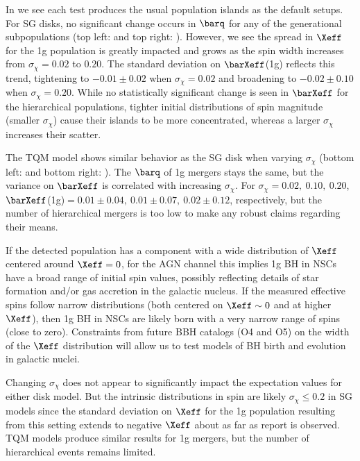 In  we see each test produces the usual population islands as the default setups.
For SG disks, no significant change occurs in $\barq$ for any of the generational subpopulations (top left:  and top right: ).
However, we see the spread in $\Xeff$ for the 1g population is greatly impacted and grows as the spin width increases from $\sigma_\chi= 0.02$ to $0.20$.
The standard deviation on $\barXeff$(1g) reflects this trend, tightening to $-0.01\pm0.02$ when $\sigma_\chi = 0.02$ and broadening to $-0.02\pm0.10$ when $\sigma_\chi = 0.20$.
While no statistically significant change is seen in $\barXeff$ for the hierarchical populations, tighter initial distributions of spin magnitude (smaller $\sigma_\chi$) cause their islands to be more concentrated, whereas a larger $\sigma_\chi$ increases their scatter.

The TQM model shows similar behavior as the SG disk when varying $\sigma_\chi$ (bottom left:  and bottom right: ).
The $\barq$ of 1g mergers stays the same, but the variance on $\barXeff$ is correlated with increasing $\sigma_\chi$.
For $\sigma_\chi=0.02,\ 0.10,\ 0.20$, $\barXeff$(1g)$=0.01\pm0.04,\ 0.01\pm0.07,\ 0.02\pm0.12$, respectively, but the number of hierarchical mergers is too low to make any robust claims regarding their means.

If the detected population has a component with a wide distribution of $\Xeff$ centered around $\Xeff=0$, for the AGN channel this implies 1g BH in NSCs have a broad range of initial spin values, possibly reflecting details of star formation and/or gas accretion in the galactic nucleus.
If the measured effective spins follow narrow distributions (both centered on $\Xeff \sim 0$ and at higher $\Xeff$), then 1g BH in NSCs are likely born with a very narrow range of spins (close to zero).
Constraints from future BBH catalogs (O4 and O5) on the width of the $\Xeff$ distribution will allow us to test models of BH birth and evolution in galactic nuclei.

Changing $\sigma_\chi$ does not appear to significantly impact the expectation values for either disk model.
But the intrinsic distributions in spin are likely $\sigma_\chi \leq 0.2$ in SG models since the standard deviation on $\Xeff$ for the 1g population resulting from this setting extends to negative $\Xeff$ about as far as \citet[]{Callister+21} report is observed.
TQM models produce similar results for 1g mergers, but the number of hierarchical events remains limited.

